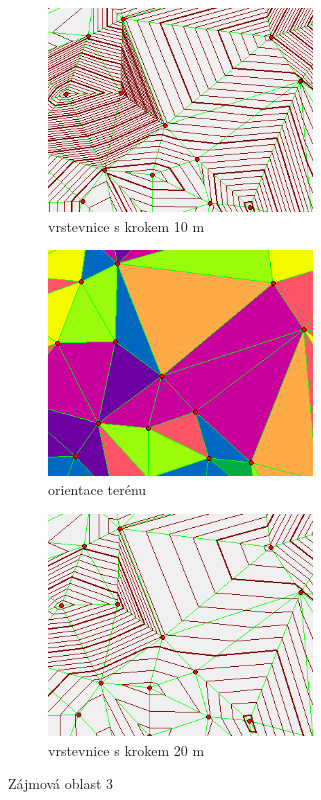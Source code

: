 \begin{figure}[H]
\begin{subfigure}{.475\linewidth}
\centering
  \includegraphics[width=7cm]{images/case3m.png}
  \caption{vrstevnice s krokem 10 m}
  \label{MLEDdet}
\end{subfigure}\hfill %
\medskip
\begin{subfigure}{.475\linewidth}
\centering
  \includegraphics[width=7cm]{images/case3a.png}
  \caption{orientace terénu}
  \label{velcomp}
\end{subfigure}\hfill %
\begin{subfigure}{.475\linewidth}
\centering
  \includegraphics[width=7cm]{images/case3m20.png}
  \caption{vrstevnice s krokem 20 m}
  \label{estcomp}
\end{subfigure}

\caption{Zájmová oblast 3}
\label{fig:roc}
\end{figure}

